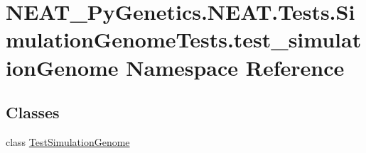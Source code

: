 \hypertarget{namespaceNEAT__PyGenetics_1_1NEAT_1_1Tests_1_1SimulationGenomeTests_1_1test__simulationGenome}{}\section{N\+E\+A\+T\+\_\+\+Py\+Genetics.\+N\+E\+A\+T.\+Tests.\+Simulation\+Genome\+Tests.\+test\+\_\+simulation\+Genome Namespace Reference}
\label{namespaceNEAT__PyGenetics_1_1NEAT_1_1Tests_1_1SimulationGenomeTests_1_1test__simulationGenome}
\subsection*{Classes}
\begin{DoxyCompactItemize}
\item 
class \hyperlink{classNEAT__PyGenetics_1_1NEAT_1_1Tests_1_1SimulationGenomeTests_1_1test__simulationGenome_1_1TestSimulationGenome}{Test\+Simulation\+Genome}
\end{DoxyCompactItemize}
